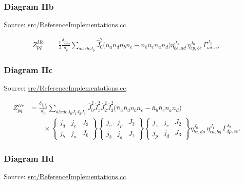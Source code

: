 \documentclass[
]{article}
\begin{document}
\subsubsection{Diagram IIb}\label{diagram-iib}

Source:
\href{../src/ReferenceImplementations.cc\#L6853-L6957}{src/ReferenceImplementations.cc}.

\begin{equation}
\begin{aligned}
Z^{IIb}_{pq}
&=\frac{1}{4}\frac{\delta_{j_pj_q}}{d_p}
\sum_{abcdeJ_0}
\hat J_0^2
\Big(\bar n_a\bar n_d n_b n_e-\bar n_b\bar n_e n_a n_d\Big)
\eta^{J_0}_{be,ad}\,
\eta^{J_0}_{cp,be}\,
\Gamma^{J_0}_{ad,cq} .
\end{aligned}
\end{equation}

\subsubsection{Diagram IIc}\label{diagram-iic}

Source:
\href{../src/ReferenceImplementations.cc\#L6963-L7078}{src/ReferenceImplementations.cc}.

\begin{equation}
\begin{aligned}
Z^{IIc}_{pq}
&=\frac{\delta_{j_pj_q}}{d_p}
\sum_{abcdeJ_0J_1J_2J_3}
\hat J_0^2\hat J_1^2\hat J_2^2\hat J_3^2
\Big(\bar n_a\bar n_d n_b n_e-\bar n_b\bar n_e n_a n_d\Big) \\
&\qquad\times
\begin{Bmatrix} j_d&j_e&J_3\\ j_b&j_a&J_0\end{Bmatrix}
\begin{Bmatrix} j_c&j_p&J_3\\ j_b&j_a&J_1\end{Bmatrix}
\begin{Bmatrix} j_e&j_c&J_2\\ j_p&j_d&J_3\end{Bmatrix}
\eta^{J_0}_{be,da}\,
\eta^{J_1}_{ca,bq}\,
\Gamma^{J_2}_{dp,ce} .
\end{aligned}
\end{equation}

\subsubsection{Diagram IId}\label{diagram-iid}

Source:
\href{../src/ReferenceImplementations.cc\#L7084-L7163}{src/ReferenceImplementations.cc}.
\end{document}
